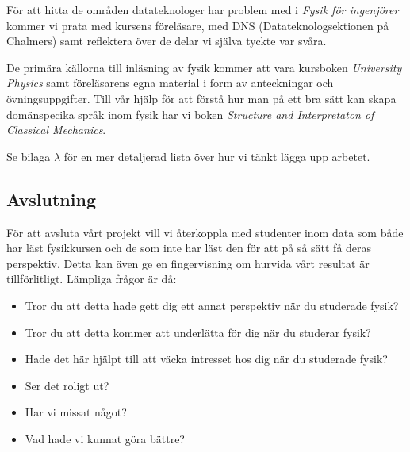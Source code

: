 \documentclass[12pt,a4paper]{article}
\begin{document}
För att hitta de områden datateknologer har problem med i \textit{Fysik för ingenjörer} kommer vi prata med kursens föreläsare, med DNS (Datateknologsektionen på Chalmers) samt reflektera över de delar vi själva tyckte var svåra.

De primära källorna till inläsning av fysik kommer att vara kursboken \textit{University Physics}\cite{UP} samt föreläsarens egna material i form av anteckningar och övningsuppgifter. Till vår hjälp för att förstå hur man på ett bra sätt kan skapa domänspecika språk inom fysik har vi boken \textit{Structure and Interpretaton of Classical Mechanics}\cite{SICM}.

Se bilaga $\lambda$ för en mer detaljerad lista över hur vi tänkt lägga upp arbetet.


\subsection{Avslutning}

För att avsluta vårt projekt vill vi återkoppla med studenter inom data som både har läst fysikkursen och de som inte har läst den för att på så sätt få deras perspektiv. Detta kan även ge en fingervisning om hurvida vårt resultat är tillförlitligt. Lämpliga frågor är då:

\begin{itemize}
    \item Tror du att detta hade gett dig ett annat perspektiv när du studerade fysik?
    \item Tror du att detta kommer att underlätta för dig när du studerar fysik?
    \item Hade det här hjälpt till att väcka intresset hos dig när du studerade fysik?
    \item Ser det roligt ut?
    \item Har vi missat något?
    \item Vad hade vi kunnat göra bättre?
\end{itemize}
\end{document}
